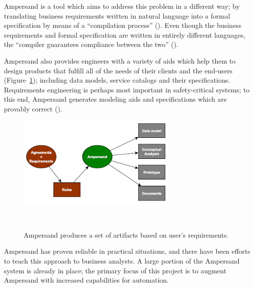 \documentclass[12pt]{report}
\begin{document}
Ampersand is a tool which aims to address this problem in a different way; by
translating business requirements written in natural language into a formal
specification by means of a ``compilation process'' (\cite{derFun}). 
%
%
Even though the business requirements and formal specification are written in
entirely different languages, the ``compiler guarantees compliance between the
two'' (\cite[2]{derFun}). 

Ampersand also provides engineers with a variety of aids which
help them to design products that fulfill all of the needs of their clients and
the end-users (Figure~\ref{fig:figure1}); including data models, service catalogs and their
specifications. Requirements engineering is perhaps most important in
safety-critical systems; to this end, Ampersand generates modeling aids and
specifications which are provably correct (\cite{derFun}). 

\begin{figure}
  \centering
    \includegraphics[width=0.7\textwidth]{../figures/ampersand_artifacts}
\caption{Ampersand produces a set of artifacts based on user's requirements.}~\label{fig:figure1}
\end{figure}

Ampersand has proven reliable in practical situations, and there have been
efforts to teach this approach to business analysts. A large portion of the
Ampersand system is already in place; the primary focus of this project is to
augment Ampersand with increased capabilities for automation.
\end{document}
